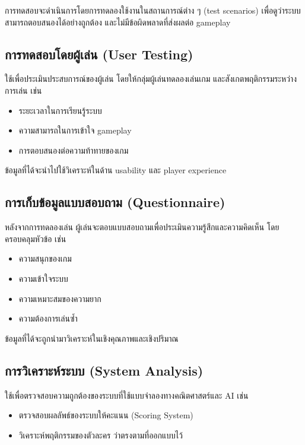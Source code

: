 การทดสอบจะดำเนินการโดยการทดลองใช้งานในสถานการณ์ต่าง ๆ (test scenarios) เพื่อดูว่าระบบสามารถตอบสนองได้อย่างถูกต้อง และไม่มีข้อผิดพลาดที่ส่งผลต่อ gameplay

\subsection{การทดสอบโดยผู้เล่น (User Testing)}

ใช้เพื่อประเมินประสบการณ์ของผู้เล่น โดยให้กลุ่มผู้เล่นทดลองเล่นเกม และสังเกตพฤติกรรมระหว่างการเล่น เช่น

\begin{itemize}
\item ระยะเวลาในการเรียนรู้ระบบ
\item ความสามารถในการเข้าใจ gameplay
\item การตอบสนองต่อความท้าทายของเกม
\end{itemize}

ข้อมูลที่ได้จะนำไปใช้วิเคราะห์ในด้าน usability และ player experience

\subsection{การเก็บข้อมูลแบบสอบถาม (Questionnaire)}

หลังจากการทดลองเล่น ผู้เล่นจะตอบแบบสอบถามเพื่อประเมินความรู้สึกและความคิดเห็น โดยครอบคลุมหัวข้อ เช่น

\begin{itemize}
\item ความสนุกของเกม
\item ความเข้าใจระบบ
\item ความเหมาะสมของความยาก
\item ความต้องการเล่นซ้ำ
\end{itemize}

ข้อมูลที่ได้จะถูกนำมาวิเคราะห์ในเชิงคุณภาพและเชิงปริมาณ

\subsection{การวิเคราะห์ระบบ (System Analysis)}

ใช้เพื่อตรวจสอบความถูกต้องของระบบที่ใช้แบบจำลองทางคณิตศาสตร์และ AI เช่น

\begin{itemize}
\item ตรวจสอบผลลัพธ์ของระบบให้คะแนน (Scoring System)
\item วิเคราะห์พฤติกรรมของตัวละคร ว่าตรงตามที่ออกแบบไว้
\end{itemize}

